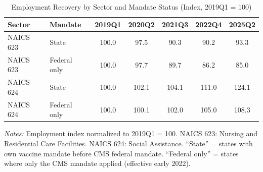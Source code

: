 \begin{table}[htbp]
\centering
\caption{Employment Recovery by Sector and Mandate Status (Index, 2019Q1 = 100)}
\label{tab:recovery}
\begin{threeparttable}
\begin{tabular}{llccccc}
\hline\hline
Sector & Mandate & 2019Q1 & 2020Q2 & 2021Q3 & 2022Q4 & 2025Q2 \\
\hline
NAICS 623 & State & 100.0 & 97.5 & 90.3 & 90.2 & 93.3 \\
NAICS 623 & Federal only & 100.0 & 97.7 & 89.7 & 86.2 & 85.0 \\
NAICS 624 & State & 100.0 & 102.1 & 104.1 & 111.0 & 124.1 \\
NAICS 624 & Federal only & 100.0 & 100.1 & 102.0 & 105.0 & 108.3 \\
\hline\hline
\end{tabular}
\begin{tablenotes}[flushleft]
\small
\item \textit{Notes:} Employment index normalized to 2019Q1 = 100. NAICS 623: Nursing and Residential Care Facilities. NAICS 624: Social Assistance. ``State'' = states with own vaccine mandate before CMS federal mandate. ``Federal only'' = states where only the CMS mandate applied (effective early 2022).
\end{tablenotes}
\end{threeparttable}
\end{table}
